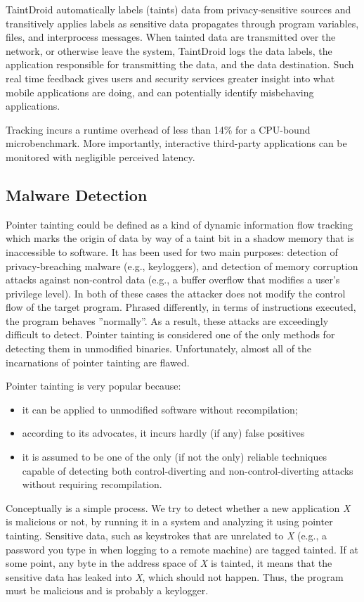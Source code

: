 TaintDroid automatically labels (taints) data from privacy-sensitive sources and transitively applies labels as sensitive data propagates through program variables, files, and interprocess messages. When tainted data are transmitted over the network, or otherwise leave the system, TaintDroid logs the data labels, the application responsible for transmitting the data, and the data destination. Such real time feedback gives users and security services greater insight into what mobile applications are doing, and can potentially identify misbehaving applications. 

Tracking incurs a runtime overhead of less than 14\% for a CPU-bound microbenchmark. More importantly, interactive third-party applications can be monitored with negligible perceived latency.

\subsection{Malware Detection}
Pointer tainting could be defined as a kind of dynamic information flow tracking which marks the origin of data by way of a taint bit in a shadow memory that is inaccessible to software. It has been used for two main purposes: detection of privacy-breaching malware (e.g., keyloggers), and detection of memory corruption attacks against non-control data (e.g., a buffer overflow that modifies a user’s privilege level). In both of these cases the attacker does not modify the control flow of the target program. Phrased differently, in terms of instructions executed, the program behaves ''normally''. As a result, these attacks are exceedingly difficult to detect. Pointer tainting is considered one of the only methods for detecting them in unmodified binaries. Unfortunately, almost all of the incarnations of pointer tainting are flawed.

Pointer tainting is very popular because:
\begin{itemize}
	\item it can be applied to unmodified software without recompilation;
	\item according to its advocates, it incurs hardly (if any) false positives
	\item it is assumed to be one of the only (if not the only) reliable techniques capable of detecting both control-diverting and non-control-diverting attacks without requiring recompilation.
\end{itemize}

Conceptually is a simple process. We try to detect whether a new application \textit{X} is malicious or not, by running it in a system and analyzing it using pointer tainting. Sensitive data, such as keystrokes that are unrelated to \textit{X} (e.g., a password you type in when logging to a remote machine) are tagged tainted. If at some point, any byte in the address space of \textit{X} is tainted, it means that the sensitive data has leaked into \textit{X}, which should not happen. Thus, the program must be malicious and is probably a keylogger.

